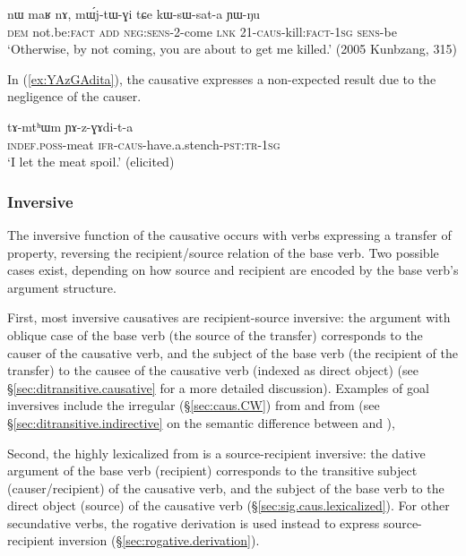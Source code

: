 \begin{exe}
\ex \label{ex:kWsWsata.YWNu}
\gll  nɯ maʁ nɤ, mɯ́j-tɯ-ɣi tɕe kɯ-sɯ-sat-a ɲɯ-ŋu \\
\textsc{dem} not.be:\textsc{fact} \textsc{add} \textsc{neg}:\textsc{sens}-2-come \textsc{lnk} 2\fl{}1-\textsc{caus}-kill:\textsc{fact}-\textsc{1sg} \textsc{sens}-be \\
\glt `Otherwise, by not coming, you are about to get me killed.' (2005 Kunbzang, 315)
\end{exe}

In (\ref{ex:YAzGAdita}), the causative expresses a non-expected result due to the negligence of the causer.

\begin{exe}
\ex \label{ex:YAzGAdita}
\gll tɤ-mtʰɯm ɲɤ-z-ɣɤdi-t-a   \\
\textsc{indef}.\textsc{poss}-meat \textsc{ifr}-\textsc{caus}-have.a.stench-\textsc{pst}:\textsc{tr}-\textsc{1sg} \\
 \glt  `I let the meat spoil.' (elicited)
\end{exe}

\subsubsection{Inversive} \label{sec:sig.caus.inversive}
The inversive function of the causative occurs with verbs expressing a transfer of property, reversing the recipient/source relation of the base verb. Two possible cases exist, depending on how source and recipient are encoded by the base verb's argument structure.

First, most inversive causatives are recipient-source inversive: the argument with oblique case of the base verb (the source of the transfer) corresponds to the causer of the causative verb, and the subject of the base verb (the recipient of the transfer) to the causee of the causative verb  (indexed as direct object) (see §\ref{sec:ditransitive.causative} for a more detailed discussion). Examples of goal inversives include the irregular  (§\ref{sec:caus.CW}) from  and  from  (see §\ref{sec:ditransitive.indirective} on the semantic difference between  and ), 

Second, the highly lexicalized  from  is a source-recipient inversive: the dative argument of the base verb (recipient) corresponds to the transitive subject (causer/recipient) of the causative verb, and the subject of the base verb to the direct object (source) of the causative verb (§\ref{sec:sig.caus.lexicalized}). For other secundative verbs, the rogative  derivation is used instead to express source-recipient inversion (§\ref{sec:rogative.derivation}).

